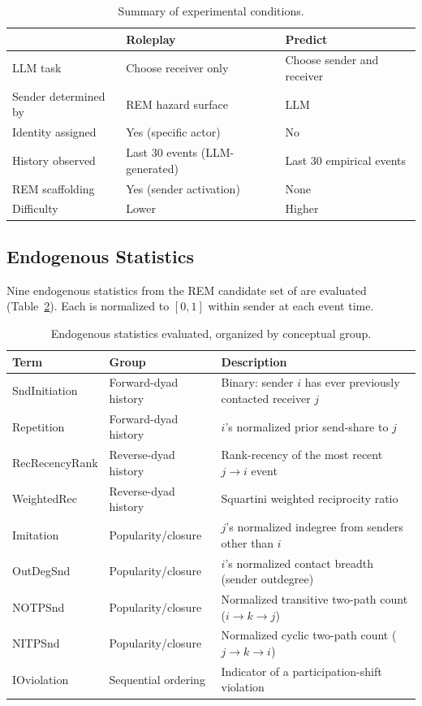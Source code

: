 \documentclass[11pt]{article}
\begin{document}
\begin{table}[H]
\centering
\caption{Summary of experimental conditions.}
\label{tab:conditions}
\begin{tabular}{lll}
\toprule
 & \textbf{Roleplay} & \textbf{Predict} \\
\midrule
LLM task           & Choose receiver only          & Choose sender and receiver \\
Sender determined by & REM hazard surface           & LLM \\
Identity assigned  & Yes (specific actor)          & No \\
History observed   & Last 30 events (LLM-generated) & Last 30 empirical events \\
REM scaffolding    & Yes (sender activation)       & None \\
Difficulty         & Lower                         & Higher \\
\bottomrule
\end{tabular}
\end{table}

\subsection{Endogenous Statistics}

Nine endogenous statistics from the REM candidate set of \citet{gibson2025four}
are evaluated (Table~\ref{tab:terms}). Each is normalized to $[0,1]$ within
sender at each event time.

\begin{table}[H]
\centering
\caption{Endogenous statistics evaluated, organized by conceptual group.}
\label{tab:terms}
\begin{tabular}{llp{7.2cm}}
\toprule
\textbf{Term} & \textbf{Group} & \textbf{Description} \\
\midrule
SndInitiation   & Forward-dyad history   & Binary: sender $i$ has ever previously contacted receiver $j$ \\
Repetition      & Forward-dyad history   & $i$'s normalized prior send-share to $j$ \\
RecRecencyRank  & Reverse-dyad history   & Rank-recency of the most recent $j \to i$ event \\
WeightedRec     & Reverse-dyad history   & Squartini weighted reciprocity ratio \\
Imitation       & Popularity/closure     & $j$'s normalized indegree from senders other than $i$ \\
OutDegSnd       & Popularity/closure     & $i$'s normalized contact breadth (sender outdegree) \\
NOTPSnd         & Popularity/closure     & Normalized transitive two-path count ($i \to k \to j$) \\
NITPSnd         & Popularity/closure     & Normalized cyclic two-path count ($j \to k \to i$) \\
IOviolation     & Sequential ordering    & Indicator of a participation-shift violation \\
\bottomrule
\end{tabular}
\end{table}
\end{document}

